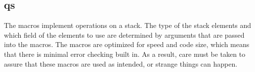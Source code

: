%
%
%
%
%

\subsection{qs}
\label{qs}

The  macros implement operations on a stack.  The type of the
stack elements and which field of the elements to use are determined by
arguments that are passed into the macros.  The macros are optimized for speed
and code size, which means that there is minimal error checking built in.  As a
result, care must be taken to assure that these macros are used as intended, or
strange things can happen.

